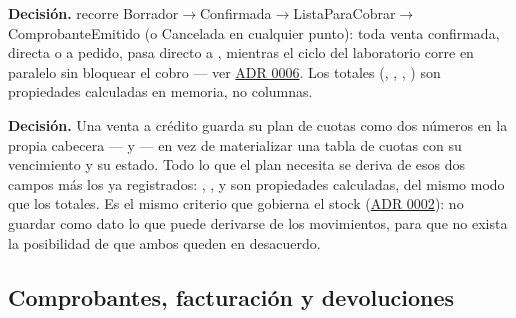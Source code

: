 \textbf{Decisión.}  recorre Borrador$\to$Confirmada$\to$ListaParaCobrar$\to$ComprobanteEmitido (o Cancelada en cualquier punto): toda venta confirmada, directa o a pedido, pasa directo a , mientras el ciclo del laboratorio corre en paralelo sin bloquear el cobro --- ver \hyperref[adr:0006]{ADR 0006}. Los totales (, , , ) son propiedades calculadas en memoria, no columnas.

\textbf{Decisión.} Una venta a crédito guarda su plan de cuotas como dos números en la propia cabecera ---  y  --- en vez de materializar una tabla de cuotas con su vencimiento y su estado. Todo lo que el plan necesita se deriva de esos dos campos más los  ya registrados: , ,  y  son propiedades calculadas, del mismo modo que los totales. Es el mismo criterio que gobierna el stock (\hyperref[adr:0002]{ADR 0002}): no guardar como dato lo que puede derivarse de los movimientos, para que no exista la posibilidad de que ambos queden en desacuerdo.

\subsection{Comprobantes, facturación y devoluciones}

